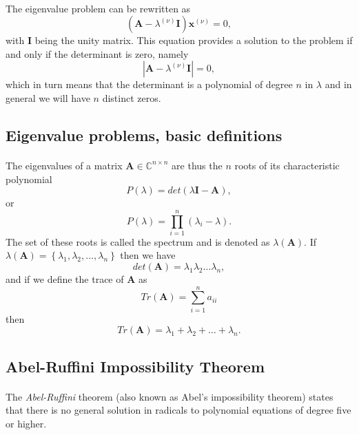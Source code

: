 \paragraph{}
The eigenvalue problem can be rewritten as 
\[
   \left( \mathbf{A}-\lambda^{(\nu)} \mathbf{I} \right) \mathbf{x}^{(\nu)} = 0,
\]
with $\mathbf{I}$ being the unity matrix. This equation provides
a solution to the problem if and only if the determinant
is zero, namely
\[
   \left| \mathbf{A}-\lambda^{(\nu)}\mathbf{I}\right| = 0,
\]
which in turn means that the determinant is a polynomial
of degree $n$ in $\lambda$ and in general we will have 
$n$ distinct zeros.



\subsection*{Eigenvalue problems, basic definitions}

\paragraph{}
The eigenvalues of a matrix 
$\mathbf{A}\in {\mathbb{C}}^{n\times n}$
are thus the $n$ roots of its characteristic polynomial 
\[
P(\lambda) = det(\lambda\mathbf{I}-\mathbf{A}),
\]
or 
\[
  P(\lambda)= \prod_{i=1}^{n}\left(\lambda_i-\lambda\right).
\]
The set of these roots is called the spectrum and is denoted as
$\lambda(\mathbf{A})$.
If $\lambda(\mathbf{A})=\left\{\lambda_1,\lambda_2,\dots ,\lambda_n\right\}$ then we have
\[
   det(\mathbf{A})= \lambda_1\lambda_2\dots\lambda_n, 
\]
and if we define the trace of $\mathbf{A}$ as
\[
Tr(\mathbf{A})=\sum_{i=1}^n a_{ii}\]
then
\[
Tr(\mathbf{A})=\lambda_1+\lambda_2+\dots+\lambda_n.
\]



\subsection*{Abel-Ruffini Impossibility Theorem}

\paragraph{}
The \emph{Abel-Ruffini} theorem (also known as Abel's impossibility theorem) 
states that there is no general solution in radicals to polynomial equations of degree five or higher.


